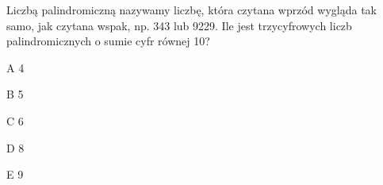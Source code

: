 \begin{tresc}
Liczbą palindromiczną nazywamy liczbę, która czytana wprzód wygląda tak samo, jak czytana wspak, np. 343 lub 9229. Ile jest trzycyfrowych liczb palindromicznych o sumie cyfr równej 10?
\end{tresc}
\begin{wariant}{A} 4 \end{wariant}
\begin{wariant}{B} 5 \end{wariant}
\begin{wariant}{C} 6 \end{wariant}
\begin{wariant}{D} 8 \end{wariant}
\begin{wariant}{E} 9 \end{wariant}
